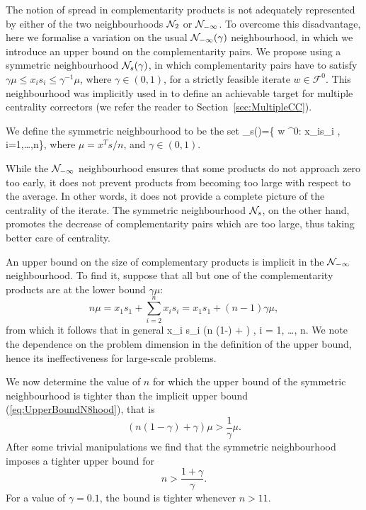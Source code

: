 The notion of spread in complementarity products
is not adequately represented by either 
of the two neighbourhoods $\mathcal{N}_2$ or $\mathcal{N}_{-\infty}$.
To overcome this disadvantage, here we formalise a variation 
on the usual $\mathcal{N}_{-\infty}(\gamma)$ neighbourhood, 
in which we introduce an upper bound on the complementarity pairs. 
We propose using a symmetric neighbourhood $\mathcal{N}_s(\gamma)$,
in which complementarity pairs have to satisfy 
$\gamma \mu \leq x_i s_i \leq \gamma^{-1} \mu$, where $\gamma \in (0,1)$, 
for a strictly feasible iterate $w \in \mathcal{F}^0$.
This neighbourhood was implicitly used in \cite{Gondzio96}
to define an achievable target for multiple centrality correctors
(we refer the reader to Section~\ref{sec:MultipleCC}).

We define the symmetric neighbourhood to be the set
\be  \label{eq:SymmetricNeighbourhood}
  \Nhood_s(\gamma)=\{ w \in {}^0: 
  \gamma\mu\le x_is_i \le {}\mu, \; i=1,\ldots,n\},
\ee
where 
$\mu = x^Ts/n$, and $\gamma \in (0,1)$.

While the $\mathcal{N}_{-\infty}$ neighbourhood ensures that some 
products do not approach zero too early, it does not prevent products
from becoming too large with respect to the average.
In other words, it does not provide a complete 
picture of the centrality of the iterate. The symmetric 
neighbourhood $\mathcal{N}_s$, on the other hand, promotes 
the decrease of complementarity pairs which are too large, thus taking 
better care of centrality.

An upper bound on the size of complementary products
is implicit in the $\mathcal{N}_{-\infty}$ neighbourhood. To find it,
suppose that all but one of the complementarity products are at the lower bound
$\gamma\mu$:
\[
  n\mu = x_1s_1 + \sum_{i=2}^n x_is_i = x_1 s_1 + (n-1)\gamma\mu,
\]
from which it follows that in general
\be  \label{eq:UpperBoundN8hood}
  x_i s_i \le (n (1-\gamma) + \gamma) \mu, \quad i = 1, \ldots, n.
\ee
We note the dependence on the problem dimension in the definition of the
upper bound, hence its ineffectiveness for large-scale problems.

We now determine the value of $n$ for which the upper bound of
the symmetric neighbourhood is tighter than the implicit upper bound
(\ref{eq:UpperBoundN8hood}), that is
\[
  (n(1-\gamma) + \gamma)\mu > \frac{1}{\gamma}\mu.
\]
After some trivial manipulations we find that
the symmetric neighbourhood imposes a tighter upper bound
for
\[
  n > \frac{1+\gamma}{\gamma}.
\]
For a value of $\gamma = 0.1$, the bound is tighter whenever
$n > 11$.

